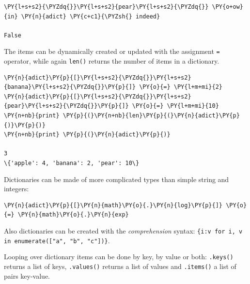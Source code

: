 \begin{codebox}[breakable, size=fbox, boxrule=1pt, pad at break*=1mm, colback=cellbackground, colframe=cellborder]
\begin{Verbatim}[commandchars=\\\{\}]
\PY{l+s+s2}{\PYZdq{}}\PY{l+s+s2}{pear}\PY{l+s+s2}{\PYZdq{}} \PY{o+ow}{in} \PY{n}{adict} \PY{c+c1}{\PYZsh{} indeed}

False
\end{Verbatim}
\end{codebox}

The items can be dynamically created or updated with the assignment \texttt{=} operator, while 
again \texttt{len()} returns the number of items in a dictionary.

\begin{codebox}[breakable, size=fbox, boxrule=1pt, pad at break*=1mm, colback=cellbackground, colframe=cellborder]
\begin{Verbatim}[commandchars=\\\{\}]
\PY{n}{adict}\PY{p}{[}\PY{l+s+s2}{\PYZdq{}}\PY{l+s+s2}{banana}\PY{l+s+s2}{\PYZdq{}}\PY{p}{]} \PY{o}{=} \PY{l+m+mi}{2}
\PY{n}{adict}\PY{p}{[}\PY{l+s+s2}{\PYZdq{}}\PY{l+s+s2}{pear}\PY{l+s+s2}{\PYZdq{}}\PY{p}{]} \PY{o}{=} \PY{l+m+mi}{10}
\PY{n+nb}{print} \PY{p}{(}\PY{n+nb}{len}\PY{p}{(}\PY{n}{adict}\PY{p}{)}\PY{p}{)}
\PY{n+nb}{print} \PY{p}{(}\PY{n}{adict}\PY{p}{)}

3
\{'apple': 4, 'banana': 2, 'pear': 10\}
\end{Verbatim}
\end{codebox}

Dictionaries can be made of more complicated types than simple string and integers:

\begin{codebox}[breakable, size=fbox, boxrule=1pt, pad at break*=1mm, colback=cellbackground, colframe=cellborder]
\begin{Verbatim}[commandchars=\\\{\}]
\PY{n}{adict}\PY{p}{[}\PY{n}{math}\PY{o}{.}\PY{n}{log}\PY{p}{]} \PY{o}{=} \PY{n}{math}\PY{o}{.}\PY{n}{exp}
\end{Verbatim}
\end{codebox}

Also dictionaries can be created with the \emph{comprehension} syntax: 
\texttt{\{i:v for i, v in enumerate(["a", "b", "c"])\}}.

Looping over dictionary items can be done by key, by value or both: \texttt{.keys()} returns a list of keys, \texttt{.values()} returns a list of values and \texttt{.items()} a list of pairs key-value.

